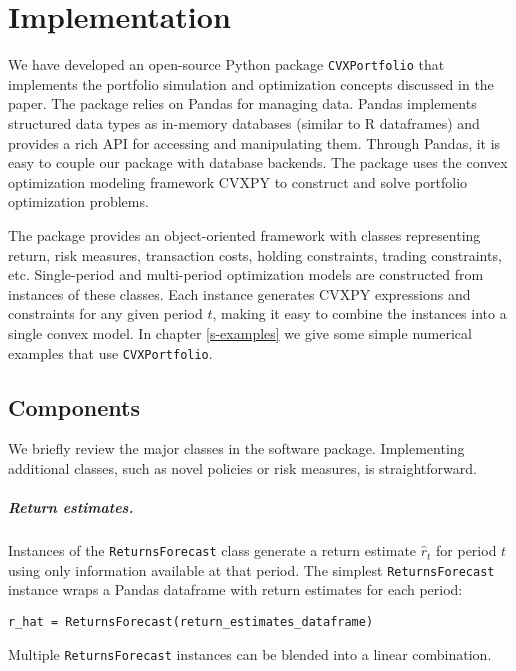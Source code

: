 \documentclass[openany]{article}  %
\begin{document}
\chapter{Implementation}
We have developed an open-source Python package
\verb|CVXPortfolio| \cite{cvxportfolio}
that implements the portfolio simulation and optimization concepts discussed in the paper.
The package relies on Pandas \cite{mckinney2012python} for managing data.
Pandas implements structured data types as in-memory databases
(similar to R dataframes) and provides a rich
API for accessing and manipulating them.
Through Pandas, it is easy to couple our package with database backends.
The package uses the convex optimization modeling framework CVXPY \cite{cvxpy}
to construct and solve portfolio optimization problems.

The package provides an object-oriented framework with classes representing
return, risk measures, transaction costs, holding constraints,
trading constraints, etc.
Single-period and multi-period optimization models are constructed
from instances of these classes.
Each instance generates CVXPY expressions and constraints for any given period $t$,
making it easy to combine the instances into a single convex model.
In chapter \ref{s-examples}
we give some simple numerical examples that use \verb|CVXPortfolio|.

\section{Components}
We briefly review the major classes in the software package.
Implementing additional classes, such as novel policies or risk measures, is straightforward.

\paragraph{Return estimates.} Instances of the \verb|ReturnsForecast| class generate a return
estimate $\hat{r}_{t}$ for period $t$ using only information available at that period.
The simplest \verb|ReturnsForecast| instance wraps a Pandas dataframe with return estimates
for each period:
\begin{verbatim}
r_hat = ReturnsForecast(return_estimates_dataframe)
\end{verbatim}
Multiple \verb|ReturnsForecast| instances can be blended into a linear combination.
\end{document}
